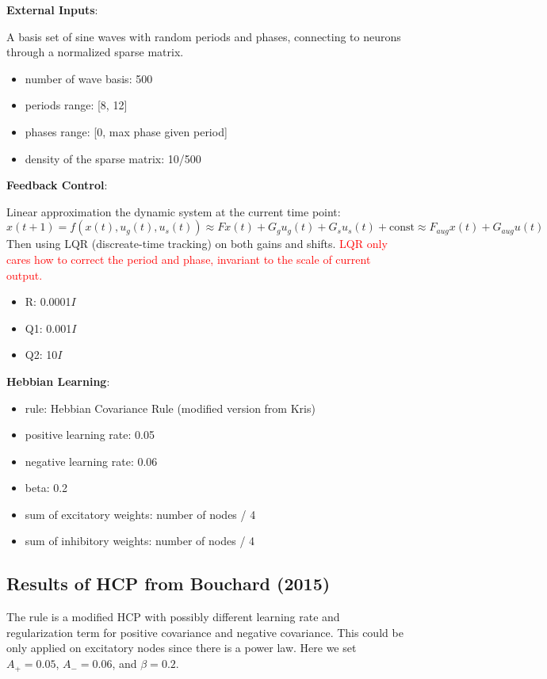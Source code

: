 \documentclass[12pt, a4paper]{article}
\begin{document}
\noindent
\textbf{External Inputs}:

A basis set of sine waves with random periods and phases, connecting to neurons through a normalized sparse matrix.

\begin{itemize}
    \item number of wave basis: 500
    \item periods range: [8, 12] 
    \item phases range: [0, max phase given period]
    \item density of the sparse matrix: 10/500
\end{itemize}

\noindent
\textbf{Feedback Control}:

Linear approximation the dynamic system at the current time point: $$x(t+1) = f(x(t), u_g(t), u_s(t)) \approx  Fx(t) + G_gu_g(t) + G_su_s(t) + \text{const} \approx  F_{aug}x(t) + G_{aug}u(t)$$
Then using LQR (discreate-time tracking) on both gains and shifts. \textcolor{red}{LQR only cares how to correct the period and phase, invariant to the scale of current output.}

\begin{itemize}
    \item R: 0.0001$I$
    \item Q1: 0.001$I$
    \item Q2: 10$I$
\end{itemize}

\noindent
\textbf{Hebbian Learning}:

\begin{itemize}
    \item rule: Hebbian Covariance Rule (modified version from Kris)
    \item positive learning rate: 0.05
    \item negative learning rate: 0.06
    \item beta: 0.2
    \item sum of excitatory weights: number of nodes / 4
    \item sum of inhibitory weights: number of nodes / 4
\end{itemize}

\newpage

\subsection*{Results of HCP from Bouchard (2015)}

The rule is a modified HCP with possibly different learning rate and regularization term for positive covariance and negative covariance. This could be only applied on excitatory nodes since there is a power law. Here we set $A_{+}=0.05$, $A_{-}=0.06$, and $\beta = 0.2$.
\end{document}
